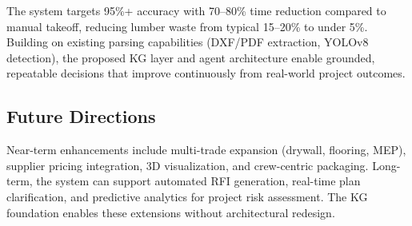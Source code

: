 The system targets 95\%+ accuracy with 70--80\% time reduction compared to manual takeoff, reducing lumber waste from typical 15--20\% to under 5\%. Building on existing parsing capabilities (DXF/PDF extraction, YOLOv8 detection), the proposed KG layer and agent architecture enable grounded, repeatable decisions that improve continuously from real-world project outcomes.

\subsection{Future Directions}

Near-term enhancements include multi-trade expansion (drywall, flooring, MEP), supplier pricing integration, 3D visualization, and crew-centric packaging. Long-term, the system can support automated RFI generation, real-time plan clarification, and predictive analytics for project risk assessment. The KG foundation enables these extensions without architectural redesign.
